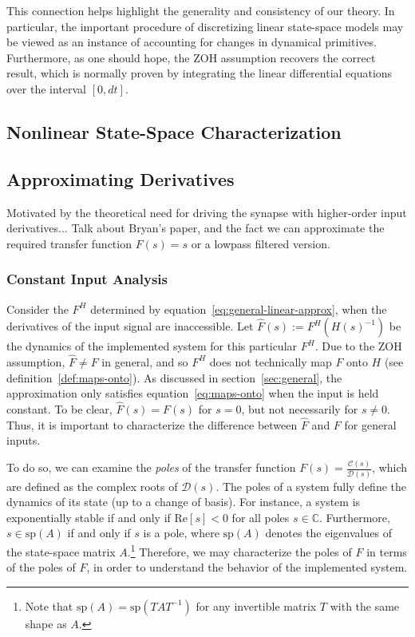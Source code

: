 This connection helps highlight the generality and consistency of our theory.
In particular, the important procedure of discretizing linear state-space models may be viewed as an instance of accounting for changes in dynamical primitives.
Furthermore, as one should hope, the ZOH assumption recovers the correct result, which is normally proven by integrating the linear differential equations over the interval $[0\text{,}\, dt]$.

\subsection{Nonlinear State-Space Characterization}

\subsection{Approximating Derivatives}

Motivated by the theoretical need for driving the synapse with higher-order input derivatives...
Talk about Bryan's paper, and the fact we can approximate the required transfer function $F(s) = s$ or a lowpass filtered version.

\subsubsection{Constant Input Analysis}

Consider the $F^H$ determined by equation~\ref{eq:general-linear-approx}, when the derivatives of the input signal are inaccessible.
Let $\hat{F}(s) := F^{H}(H(s)^{-1})$ be the dynamics of the implemented system for this particular $F^H$.
Due to the ZOH assumption, $\hat{F} \ne F$ in general, and so $F^H$ does not technically map $F$ onto $H$ (see definition~\ref{def:maps-onto}).
As discussed in section~\ref{sec:general}, the approximation only satisfies equation~\ref{eq:maps-onto} when the input is held constant.
To be clear, $\hat{F}(s) = F(s)$ for $s = 0$, but not necessarily for $s \ne 0$.
Thus, it is important to characterize the difference between $\hat{F}$ and $F$ for general inputs.

To do so, we can examine the \emph{poles} of the transfer function $F(s) = \frac{\mathcal{C}(s)}{\mathcal{D}(s)}$, which are defined as the complex roots of $\mathcal{D}(s)$.
The poles of a system fully define the dynamics of its state (up to a change of basis).
For instance, a system is exponentially stable if and only if $\text{Re} \left[ s \right] < 0$ for all poles $s \in \mathbb{C}$.
Furthermore, $s \in \text{sp}(A)$ if and only if $s$ is a pole, where $\text{sp}(A)$ denotes the eigenvalues of the state-space matrix $A$.\footnote{
Note that $\text{sp}(A) = \text{sp}(TAT^{-1})$ for any invertible matrix $T$ with the same shape as $A$.
}
Therefore, we may characterize the poles of $\hat{F}$ in terms of the poles of $F$, in order to understand the behavior of the implemented system.

